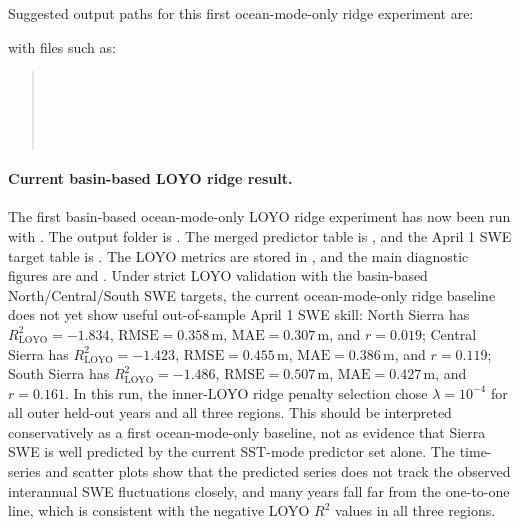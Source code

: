 \documentclass[11pt]{article}
\begin{document}
Suggested output paths for this first ocean-mode-only ridge experiment are:
\begin{quote}
\end{quote}
with files such as:
\begin{quote}
\\
\\
\\
\\
\end{quote}

\paragraph{Current basin-based LOYO ridge result.}
The first basin-based ocean-mode-only LOYO ridge experiment has now been run with
. The output folder is
. The merged predictor table is
,
and the April 1 SWE target table is
.
The LOYO metrics are stored in
, and the main
diagnostic figures are
and
.
Under strict LOYO validation with the basin-based North/Central/South SWE targets, the current
ocean-mode-only ridge baseline does not yet show useful out-of-sample April 1 SWE skill:
North Sierra has $R^2_{\mathrm{LOYO}}=-1.834$, $\mathrm{RMSE}=0.358\,\mathrm{m}$,
$\mathrm{MAE}=0.307\,\mathrm{m}$, and $r=0.019$; Central Sierra has
$R^2_{\mathrm{LOYO}}=-1.423$, $\mathrm{RMSE}=0.455\,\mathrm{m}$,
$\mathrm{MAE}=0.386\,\mathrm{m}$, and $r=0.119$; South Sierra has
$R^2_{\mathrm{LOYO}}=-1.486$, $\mathrm{RMSE}=0.507\,\mathrm{m}$,
$\mathrm{MAE}=0.427\,\mathrm{m}$, and $r=0.161$. In this run, the inner-LOYO ridge penalty
selection chose $\lambda=10^{-4}$ for all outer held-out years and all three regions. This should
be interpreted conservatively as a first ocean-mode-only baseline, not as evidence that Sierra SWE
is well predicted by the current SST-mode predictor set alone. The time-series and scatter plots
show that the predicted series does not track the observed interannual SWE fluctuations closely,
and many years fall far from the one-to-one line, which is consistent with the negative LOYO
$R^2$ values in all three regions.
\end{document}
